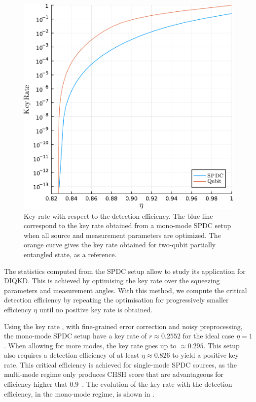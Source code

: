 \begin{figure}[ht!]
	\begin{center}
		\includegraphics[width=.95\textwidth]{chapters/deviceindependent/img/key_rate_spdc.pdf}
	\end{center}
	\caption{Key rate with respect to the detection efficiency. The blue line correspond to the key rate obtained from a mono-mode SPDC setup when all source and measurement parameters are optimized.
	The orange curve gives the key rate obtained for two-qubit partially entangled state, as a reference.}
	\label{fig:SPDC_kr}
\end{figure}

The statistics computed from the SPDC setup allow to study its application for DIQKD.
This is achieved by optimising the key rate over the squeezing parameters and measurement angles.
With this method, we compute the critical detection efficiency by repeating the optimisation for progressively smaller efficiency $\eta$ until no positive key rate is obtained.

Using the key rate , with fine-grained error correction and noisy preprocessing, the mono-mode SPDC setup have a key rate of $r\approx 0.2552$ for the ideal case $\eta=1$. 
When allowing for more modes, the key rate goes up to $\approx 0.295$.
This setup also requires a detection efficiency of at least $\eta\approx 0.826$ to yield a positive key rate.
This critical efficiency is achieved for single-mode SPDC sources, as the multi-mode regime only produces CHSH score that are advantageous for efficiency higher that $0.9$~\cite{Vivoli2015b}.
The evolution of the key rate with the detection efficiency, in the mono-mode regime, is shown in .


